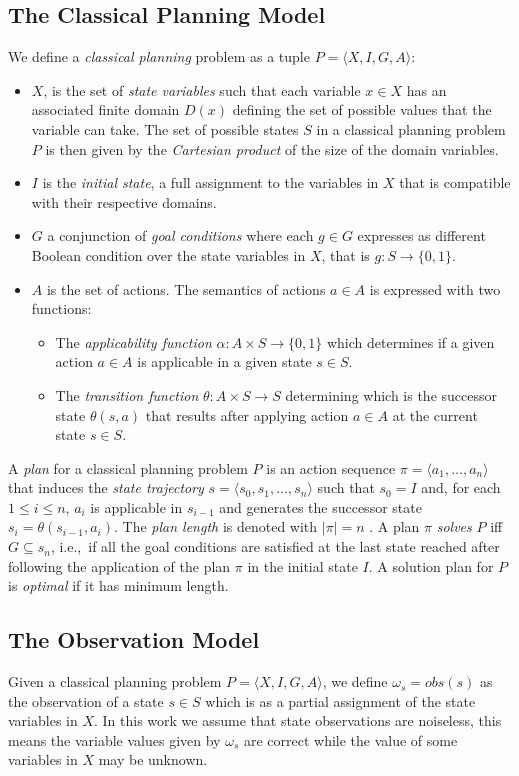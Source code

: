 \documentclass[letterpaper]{article} %
\newcommand{\tup}[1]{{\langle #1 \rangle}}
\begin{document}
\subsection{The Classical Planning Model}
We define a {\em classical planning} problem as a tuple $P=\tup{X,I,G,A}$:
\begin{itemize}
\item $X$, is the set of {\em state variables} such that each variable $x\in X$ has an associated finite domain $D(x)$ defining the set of possible values that the variable can take. The set of possible states $S$ in a classical planning problem $P$ is then given by the {\em Cartesian product} of the size of the domain variables.
\item $I$ is the {\em initial state}, a full assignment to the variables in $X$ that is compatible with their respective domains.
\item $G$ a conjunction of {\em goal conditions} where each $g\in G$ expresses as different Boolean condition over the state variables in $X$, that is $g:S\rightarrow \{0,1\}$.
\item $A$ is the set of actions. The semantics of actions $a\in A$ is expressed with two functions:
\begin{itemize}
\item The {\em applicability function} $\alpha:A\times S\rightarrow \{0,1\}$ which determines if a given action $a\in A$ is applicable in a given state $s\in S$.
\item The {\em transition function} $\theta:A\times S\rightarrow S$ determining which is the successor state $\theta(s,a)$ that results after applying action $a\in A$ at the current state $s\in S$.
\end{itemize}
\end{itemize}

A {\em plan} for a classical planning problem $P$ is an action sequence $\pi=\tup{a_1, \ldots, a_n}$ that induces the {\em state trajectory} $s=\tup{s_0, s_1, \ldots, s_n}$ such that $s_0=I$ and, for each {\small $1\leq i\leq n$}, $a_i$ is applicable in $s_{i-1}$ and generates the successor state $s_i=\theta(s_{i-1},a_i)$. The {\em plan length} is denoted with $|\pi|=n$ . A plan $\pi$ {\em solves} $P$ iff $G\subseteq s_n$, i.e.,~if all the goal conditions are satisfied at the last state reached after following the application of the plan $\pi$ in the initial state $I$. A solution plan for $P$ is {\em optimal} if it has minimum length.

\subsection{The Observation Model}
Given a classical planning problem $P=\tup{X,I,G,A}$, we define $\omega_s=obs(s)$ as the observation of a state $s\in S$ which is as a partial assignment of the state variables in $X$. In this work we assume that state observations are noiseless, this means the variable values given by $\omega_s$ are correct while the value of some variables in $X$ may be unknown.
\end{document}
